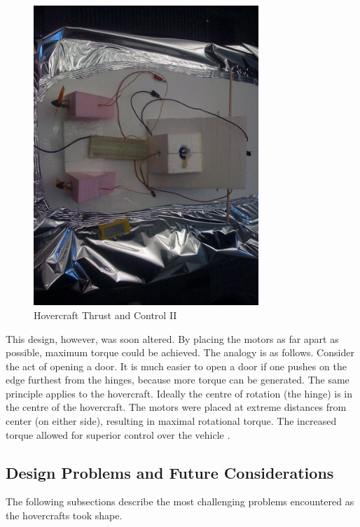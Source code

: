 \begin{figure}[h]
  \begin{center}
    \includegraphics[width=85mm]{imageSources/thrustControl2.png}
  \end{center}
  \caption{Hovercraft Thrust and Control II} 
  \label{thrustControl2}
\end{figure}

This design, however, was soon altered. By placing the motors as far apart as possible, maximum torque could be achieved. The analogy is as follows. Consider the act of opening a door. It is much easier to open a door if one pushes on the edge furthest from the hinges, because more torque can be generated. The same principle applies to the hovercraft. Ideally the centre of rotation (the hinge) is in the centre of the hovercraft. The motors were placed at extreme distances from center (on either side), resulting in maximal rotational torque.   The increased torque allowed for superior control over the vehicle \cite{831309}. 

\subsection{Design Problems and Future Considerations}
The following subsections describe the most challenging problems encountered as the hovercrafts took shape.  

